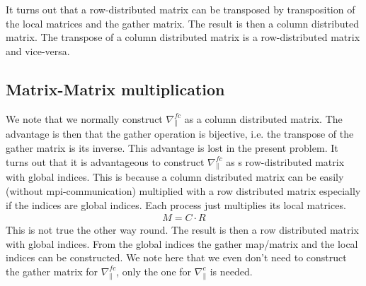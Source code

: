 It turns out that a row-distributed matrix can be transposed
by transposition of the local matrices and the gather matrix.
The result is then a column distributed matrix.
The transpose of a column distributed matrix is a row-distributed matrix and vice-versa.

\subsection{Matrix-Matrix multiplication}
We note that we normally construct $\nabla_\parallel^{fc}$ as a column 
distributed
matrix. The advantage is then that the gather operation is bijective, i.e. the transpose of the gather matrix is its inverse. 
This advantage is lost in the present problem. 
It turns out that it is advantageous to construct $\nabla_\parallel^{fc}$
as s row-distributed matrix with global indices. 
This is because a column distributed matrix can be easily (without mpi-communication) multiplied
with a row distributed matrix especially if the indices are global indices. 
Each process just multiplies its local matrices.
\begin{align}
M = C\cdot R
\end{align}
This is not true the other way round. 
The result is then a row distributed matrix with global indices. 
From the global indices the gather map/matrix and the local
indices can be constructed.
We note here that we even don't need to construct the gather matrix
for $\nabla_\parallel^{fc}$, only the one for $\nabla_\parallel^c$ is
needed.








